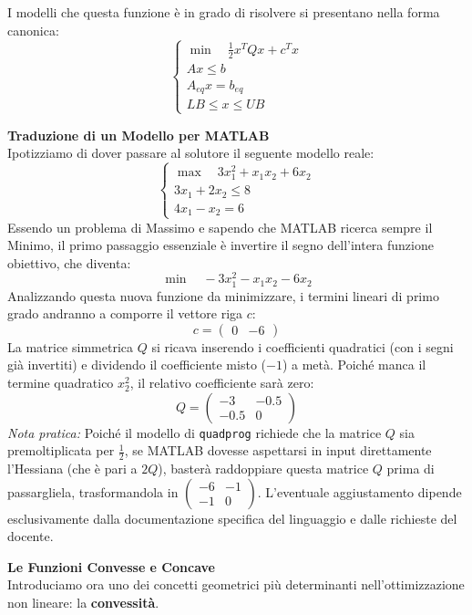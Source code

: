 \documentclass[12pt, a4paper]{article}
\newcommand{\separatore}{\noindent{\color{titlecolor!50}\rule{\textwidth}{0.6pt}}}
\begin{document}
	I modelli che questa funzione è in grado di risolvere si presentano nella forma canonica:
	\[
	\begin{cases}
		\min \quad \frac{1}{2} x^T Q x + c^T x \\
		Ax \le b \\
		A_{eq}x = b_{eq} \\
		LB \le x \le UB
	\end{cases}
	\]
	
	\textbf{Traduzione di un Modello per MATLAB}\\
	Ipotizziamo di dover passare al solutore il seguente modello reale:
	\[
	\begin{cases}
		\max \quad 3x_1^2 + x_1 x_2 + 6x_2 \\
		3x_1 + 2x_2 \le 8 \\
		4x_1 - x_2 = 6
	\end{cases}
	\]
	Essendo un problema di Massimo e sapendo che MATLAB ricerca sempre il Minimo, il primo passaggio essenziale è invertire il segno dell'intera funzione obiettivo, che diventa:
	\[ \min \quad -3x_1^2 - x_1 x_2 - 6x_2 \]
	Analizzando questa nuova funzione da minimizzare, i termini lineari di primo grado andranno a comporre il vettore riga $c$:
	\[ c = \begin{pmatrix} 0 & -6 \end{pmatrix} \]
	La matrice simmetrica $Q$ si ricava inserendo i coefficienti quadratici (con i segni già invertiti) e dividendo il coefficiente misto ($-1$) a metà. Poiché manca il termine quadratico $x_2^2$, il relativo coefficiente sarà zero:
	\[ Q = \begin{pmatrix} -3 & -0.5 \\ -0.5 & 0 \end{pmatrix} \]
	\textit{Nota pratica:} Poiché il modello di \texttt{quadprog} richiede che la matrice $Q$ sia premoltiplicata per $\frac{1}{2}$, se MATLAB dovesse aspettarsi in input direttamente l'Hessiana (che è pari a $2Q$), basterà raddoppiare questa matrice $Q$ prima di passargliela, trasformandola in $\begin{pmatrix} -6 & -1 \\ -1 & 0 \end{pmatrix}$. L'eventuale aggiustamento dipende esclusivamente dalla documentazione specifica del linguaggio e dalle richieste del docente.
	
	\vspace{0.6cm}
	\separatore
	\vspace{0.4cm}
	
	\textbf{Le Funzioni Convesse e Concave}\\
	Introduciamo ora uno dei concetti geometrici più determinanti nell'ottimizzazione non lineare: la \textbf{convessità}. 
	
\end{document}
